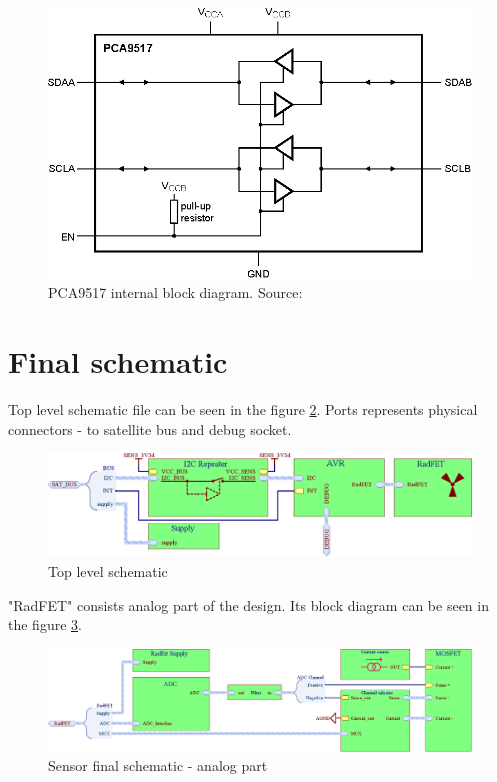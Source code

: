         \begin{figure}[H]
            \centering
            \includegraphics[width=0.7\paperwidth]{img/06/PCA9517.eps}
            \caption{PCA9517 internal block diagram. Source: \cite{PCA9517_datasheet}}
            \label{PCA9517}
        \end{figure}


\section{Final schematic}
    Top level schematic file can be seen in the figure \ref{top_level_schematic}. Ports represents physical connectors - to satellite bus and debug socket.

    \begin{figure}[H]
        \centering
        \includegraphics[width=0.8\paperwidth]{img/06/final_schematic_top.eps}
        \caption{Top level schematic}
        \label{top_level_schematic}
    \end{figure}

    "RadFET" consists analog part of the design. Its block diagram can be seen in the figure \ref{analog_schematic}.

    \begin{figure}[H]
        \centering
        \includegraphics[width=0.8\paperwidth]{img/06/final_schematic_radfet.eps}
        \caption{Sensor final schematic - analog part}
        \label{analog_schematic}
    \end{figure}


